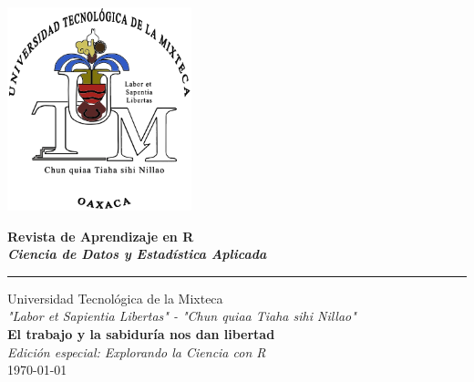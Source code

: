 \begin{center}
  \includegraphics[width=0.4\textwidth]{img/logo.png}\par\vspace{1cm}

  \Huge\bfseries Revista de Aprendizaje en R \\
  \vspace{0.5cm}
  \Large\itshape Ciencia de Datos y Estadística Aplicada \\[2cm]
  
  \Huge\bfseries \tituloPDF \par
  \rule{0.8\textwidth}{1pt}\par\vspace{2cm}

  \large Universidad Tecnológica de la Mixteca \\[0.5cm]
  \textit{"Labor et Sapientia Libertas" - "Chun quiaa Tiaha sihi Nillao"} \\
  \textbf{El trabajo y la sabiduría nos dan libertad} \\[1.5cm]

  \textit{Edición especial: Explorando la Ciencia con R} \\[0.5cm]
  \today
\end{center}

\clearpage
